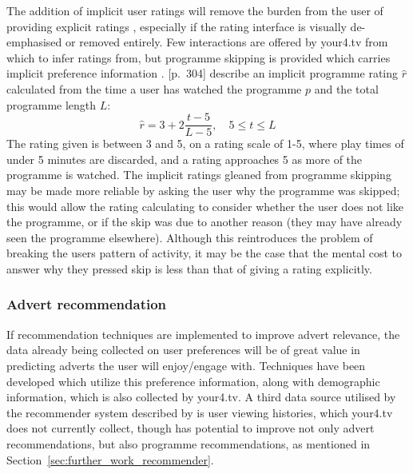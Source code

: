 		The addition of implicit user ratings will remove the burden from the user of providing explicit ratings \citep{implicit_indicators}, especially if the rating interface is visually de-emphasised or removed entirely. Few interactions are offered by your4.tv from which to infer ratings from, but programme skipping is provided which carries implicit preference information \cite{exploiting_implicit_feedback}. \citep{recommender-systems-handbook}[p.~304] describe an implicit programme rating $\hat{r}$ calculated from the time a user has watched the programme $p$ and the total programme length $L$:
		$$
			\hat{r} = 3 + 2 \frac{t - 5}{L - 5},\quad 5 \leq t \leq L
		$$
		The rating given is between 3 and 5, on a rating scale of 1-5, where play times of under 5 minutes are discarded, and a rating approaches 5 as more of the programme is watched. The implicit ratings gleaned from programme skipping may be made more reliable by asking the user why the programme was skipped; this would allow the rating calculating to consider whether the user does not like the programme, or if the skip was due to another reason (they may have already seen the programme elsewhere). Although this reintroduces the problem of breaking the users pattern of activity, it may be the case that the mental cost to answer why they pressed skip is less than that of giving a rating explicitly.

	\subsubsection{Advert recommendation}

	If recommendation techniques are implemented to improve advert relevance, the data already being collected on user preferences will be of great value in predicting adverts the user will enjoy/engage with. Techniques have been developed \cite{contextual_advertising} which utilize this preference information, along with demographic \cite{contextual_advertising} information, which is also collected by your4.tv. A third data source utilised by the recommender system described by \cite{contextual_advertising} is user viewing histories, which your4.tv does not currently collect, though has potential to improve not only advert recommendations, but also programme recommendations, as mentioned in Section~\ref{sec:further_work_recommender}.


